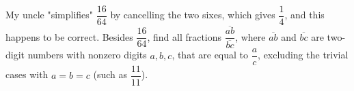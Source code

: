 My uncle "simplifies" $\dfrac{16}{64}$ by cancelling the two sixes, which gives $\dfrac{1}{4}$, and this happens to be correct. Besides $\dfrac{16}{64}$, find all fractions $\dfrac{\overline{ab}}{\overline{bc}}$, where $\overline{ab}$ and $\overline{bc}$ are two-digit numbers with nonzero digits $a,b,c$, that are equal to $\dfrac{a}{c}$, excluding the trivial cases with $a=b=c$ (such as $\dfrac{11}{11}$).
